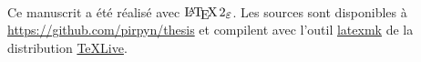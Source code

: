 ~{}

Ce manuscrit a été réalisé avec \(\LaTeXe\). Les sources sont disponibles à \url{https://github.com/pirpyn/thesis} et compilent avec l'outil \href{https://mg.readthedocs.io/latexmk.html}{latexmk} de la distribution \href{https://tug.org/texlive}{TeXLive}. 
